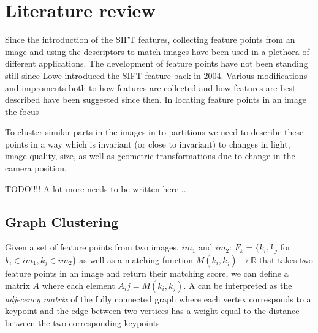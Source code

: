 \documentclass{article}
\begin{document}
\section{Literature review}

Since the introduction of the SIFT features\cite{lowe2004sift}, 
collecting feature points from an image and using the descriptors to 
match images have been used in a plethora of different applications. The 
development of feature points have not been standing still since Lowe 
introduced the SIFT feature back in 2004. Various modifications and 
improments both to how features are collected and how features are best 
described have been suggested since then. In locating feature points in 
an image the focus 


To cluster similar parts in the images in to partitions we need to 
describe these points in a way which is invariant (or close to 
invariant) to changes in light, image quality, size, as well as 
geometric transformations due to change in the camera position.

TODO!!!! A lot more needs to be written here ...

\subsection{Graph Clustering}

Given a set of feature points from two images, $im_1$ and $im_2$: $F_k = 
\{k_i, k_j$ for $k_i \in im_1, k_j \in im_2\}$ as well as a matching 
function $M(k_i, k_j) \rightarrow \mathbb{R}$ that takes two feature 
points in an image and return their matching score, we can define a 
matrix $A$ where each element $A_ij = M(k_i, k_j)$. A can be interpreted 
as the \emph{adjecency matrix} of the fully connected graph where each 
vertex corresponds to a keypoint and the edge between two vertices has a 
weight equal to the distance between the two corresponding keypoints.
\end{document}
